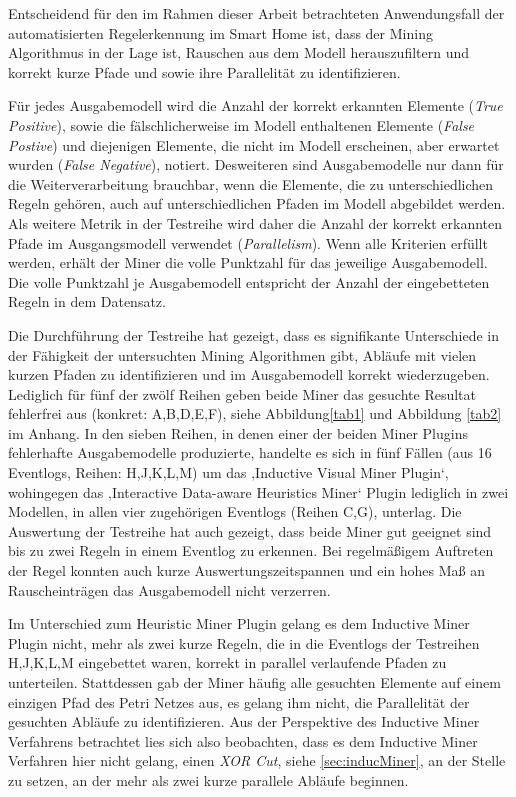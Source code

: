 Entscheidend für den im Rahmen dieser Arbeit betrachteten Anwendungsfall der automatisierten Regelerkennung im Smart Home ist, dass der Mining Algorithmus in der Lage ist, Rauschen aus dem Modell herauszufiltern und korrekt kurze Pfade und sowie ihre Parallelität zu identifizieren. 

Für jedes Ausgabemodell wird die Anzahl der korrekt erkannten Elemente (\textit{True Positive}), sowie die fälschlicherweise im Modell enthaltenen Elemente (\textit{False Postive}) und diejenigen Elemente, die nicht im Modell erscheinen, aber erwartet wurden (\textit{False Negative}), notiert. 
Desweiteren sind Ausgabemodelle nur dann für die Weiterverarbeitung brauchbar, wenn die Elemente, die zu unterschiedlichen Regeln gehören, auch auf unterschiedlichen Pfaden im Modell abgebildet werden. Als weitere Metrik in der Testreihe wird daher die Anzahl der korrekt erkannten Pfade im Ausgangsmodell verwendet (\textit{Parallelism}). Wenn alle Kriterien erfüllt werden, erhält der Miner die volle Punktzahl für das jeweilige Ausgabemodell. Die volle Punktzahl je Ausgabemodell entspricht der Anzahl der eingebetteten Regeln in dem Datensatz.

Die Durchführung der Testreihe hat gezeigt, dass es signifikante Unterschiede in der Fähigkeit der untersuchten Mining Algorithmen gibt, Abläufe mit vielen kurzen Pfaden zu identifizieren und im Ausgabemodell korrekt wiederzugeben. Lediglich für fünf der zwölf Reihen geben beide Miner das gesuchte Resultat fehlerfrei aus (konkret: A,B,D,E,F), siehe Abbildung\ref{tab1} und Abbildung \ref{tab2} im Anhang. In den sieben Reihen, in denen einer der beiden Miner Plugins fehlerhafte Ausgabemodelle produzierte, handelte es sich in fünf Fällen (aus 16 Eventlogs, Reihen: H,J,K,L,M) um das ‚Inductive Visual Miner Plugin‘, wohingegen das ‚Interactive Data-aware Heuristics Miner‘ Plugin lediglich in zwei Modellen, in allen vier zugehörigen Eventlogs (Reihen C,G), unterlag. Die Auswertung der Testreihe hat auch gezeigt, dass beide Miner gut geeignet sind bis zu zwei Regeln in einem Eventlog zu erkennen. Bei regelmäßigem Auftreten der Regel konnten auch kurze Auswertungszeitspannen und ein hohes Maß an Rauscheinträgen das Ausgabemodell nicht verzerren.

Im Unterschied zum Heuristic Miner Plugin gelang es dem Inductive Miner Plugin nicht, mehr als zwei kurze Regeln, die in die Eventlogs der Testreihen H,J,K,L,M eingebettet waren, korrekt in parallel verlaufende Pfaden zu unterteilen. Stattdessen gab der Miner häufig alle gesuchten Elemente auf einem einzigen Pfad des Petri Netzes aus, es gelang ihm nicht, die Parallelität der gesuchten Abläufe zu identifizieren. 
Aus der Perspektive des Inductive Miner Verfahrens betrachtet lies sich also beobachten, dass es dem Inductive Miner Verfahren hier nicht gelang, einen \textit{XOR Cut}, siehe \ref{sec:inducMiner}, an der Stelle zu setzen, an der mehr als zwei kurze parallele Abläufe beginnen. 

